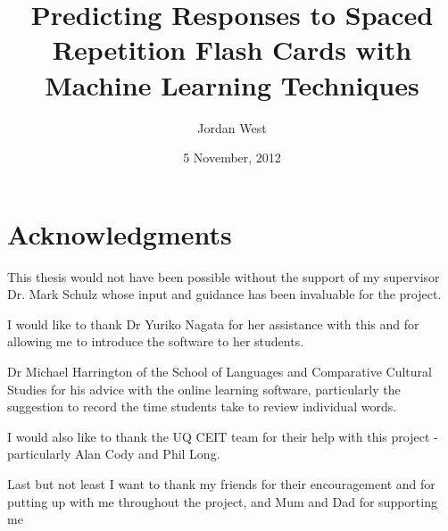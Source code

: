 \documentclass[a4paper]{article}
\title{Predicting Responses to Spaced Repetition Flash Cards with Machine Learning Techniques}
\date{5 November, 2012}
\author{Jordan West}
\begin{document}


\tableofcontents
\newpage








\section{Acknowledgments}
This thesis would not have been possible without the support of my
supervisor Dr. Mark Schulz whose input and guidance
has been invaluable for the project.

I would like to thank Dr Yuriko Nagata for her assistance with this and for allowing
me to introduce the software to her students.

Dr Michael Harrington of the School of Languages and Comparative Cultural Studies
for his advice with the online learning software, particularly the suggestion
to record the time students take to review individual words.

I would also like to thank the UQ CEIT team for their help with this project -
particularly Alan Cody and Phil Long.

Last but not least I want to thank my friends for their encouragement and
for putting up with me throughout the project, and Mum and Dad for supporting me

%
%
\printbibliography

\appendix
\end{document}
